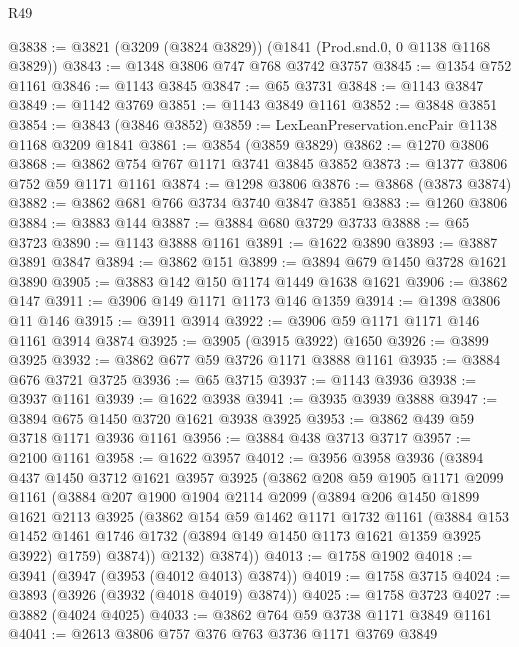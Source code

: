 \begin{lexlean}{R49}
\begin{coremodule}
@3838 := @3821 (@3209 (@3824 @3829)) (@1841 (Prod.snd.{0, 0} @1138 @1168 @3829))
@3843 := @1348 @3806 @747 @768 @3742 @3757
@3845 := @1354 @752 @1161
@3846 := @1143 @3845
@3847 := @65 @3731
@3848 := @1143 @3847
@3849 := @1142 @3769
@3851 := @1143 @3849 @1161
@3852 := @3848 @3851
@3854 := @3843 (@3846 @3852)
@3859 := LexLeanPreservation.encPair @1138 @1168 @3209 @1841
@3861 := @3854 (@3859 @3829)
@3862 := @1270 @3806
@3868 := @3862 @754 @767 @1171 @3741 @3845 @3852
@3873 := @1377 @3806 @752 @59 @1171 @1161
@3874 := @1298 @3806
@3876 := @3868 (@3873 @3874)
@3882 := @3862 @681 @766 @3734 @3740 @3847 @3851
@3883 := @1260 @3806
@3884 := @3883 @144
@3887 := @3884 @680 @3729 @3733
@3888 := @65 @3723
@3890 := @1143 @3888 @1161
@3891 := @1622 @3890
@3893 := @3887 @3891 @3847
@3894 := @3862 @151
@3899 := @3894 @679 @1450 @3728 @1621 @3890
@3905 := @3883 @142 @150 @1174 @1449 @1638 @1621
@3906 := @3862 @147
@3911 := @3906 @149 @1171 @1173 @146 @1359
@3914 := @1398 @3806 @11 @146
@3915 := @3911 @3914
@3922 := @3906 @59 @1171 @1171 @146 @1161 @3914 @3874
@3925 := @3905 (@3915 @3922) @1650
@3926 := @3899 @3925
@3932 := @3862 @677 @59 @3726 @1171 @3888 @1161
@3935 := @3884 @676 @3721 @3725
@3936 := @65 @3715
@3937 := @1143 @3936
@3938 := @3937 @1161
@3939 := @1622 @3938
@3941 := @3935 @3939 @3888
@3947 := @3894 @675 @1450 @3720 @1621 @3938 @3925
@3953 := @3862 @439 @59 @3718 @1171 @3936 @1161
@3956 := @3884 @438 @3713 @3717
@3957 := @2100 @1161
@3958 := @1622 @3957
@4012 := @3956
    @3958
    @3936
    (@3894
      @437
      @1450
      @3712
      @1621
      @3957
      @3925
      (@3862
        @208
        @59
        @1905
        @1171
        @2099
        @1161
        (@3884
          @207
          @1900
          @1904
          @2114
          @2099
          (@3894
            @206
            @1450
            @1899
            @1621
            @2113
            @3925
            (@3862
              @154
              @59
              @1462
              @1171
              @1732
              @1161
              (@3884
                @153
                @1452
                @1461
                @1746
                @1732
                (@3894 @149 @1450 @1173 @1621 @1359 @3925 @3922)
                @1759)
              @3874))
          @2132)
        @3874))
@4013 := @1758 @1902
@4018 := @3941 (@3947 (@3953 (@4012 @4013) @3874))
@4019 := @1758 @3715
@4024 := @3893 (@3926 (@3932 (@4018 @4019) @3874))
@4025 := @1758 @3723
@4027 := @3882 (@4024 @4025)
@4033 := @3862 @764 @59 @3738 @1171 @3849 @1161
@4041 := @2613 @3806 @757 @376 @763 @3736 @1171 @3769 @3849

\end{coremodule}
\end{lexlean}
